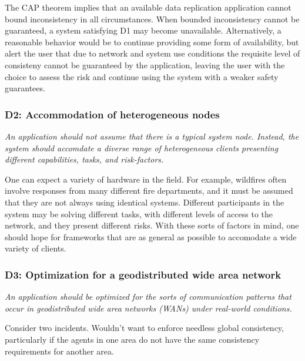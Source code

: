 \documentclass[]             %
{NASA}                       %
\theoremstyle{definition}
\begin{document}
The CAP theorem implies that an available data replication application
cannot bound inconsistency in all circumstances. When bounded
inconsistency cannot be guaranteed, a system satisfying D1 may become
unavailable. Alternatively, a reasonable behavior would be to continue
providing some form of availability, but alert the user that due to
network and system use conditions the requisite level of consisteny
cannot be guaranteed by the application, leaving the user with the
choice to assess the risk and continue using the system with a weaker
safety guarantees.

\hypertarget{d2-accommodation-of-heterogeneous-nodes}{%
\subsubsection{D2: Accommodation of heterogeneous
nodes}\label{d2-accommodation-of-heterogeneous-nodes}}

\emph{An application should not assume that there is a typical system
node. Instead, the system should accomdate a diverse range of
heterogeneous clients presenting different capabilities, tasks, and
risk-factors.}

One can expect a variety of hardware in the field. For example,
wildfires often involve responses from many different fire departments,
and it must be assumed that they are not always using identical systems.
Different participants in the system may be solving different tasks,
with different levels of access to the network, and they present
different risks. With these sorts of factors in mind, one should hope
for frameworks that are as general as possible to accomodate a wide
variety of clients.

\hypertarget{d3-optimization-for-a-geodistributed-wide-area-network}{%
\subsubsection{D3: Optimization for a geodistributed wide area
network}\label{d3-optimization-for-a-geodistributed-wide-area-network}}

\emph{An application should be optimized for the sorts of
communication patterns that occur in geodistributed wide area networks
(WANs) under real-world conditions.}

Consider two incidents. Wouldn't want to enforce needless global
consistency, particularly if the agents in one area do not have the same
consistency requirements for another area.
\end{document}
